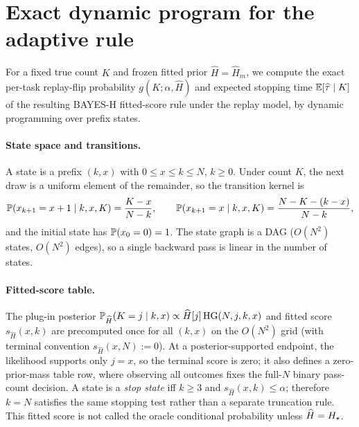 \section{Exact dynamic program for the adaptive rule}
\label{app:dp}

For a fixed true count $K$ and frozen fitted prior
$\widehat H=\widehat H_m$, we compute the exact per-task replay-flip
probability $g(K;\alpha,\widehat H)$ and expected stopping time
$\E[\widehat\tau\mid K]$ of the resulting BAYES-H fitted-score rule under the
replay model, by dynamic programming over prefix states.

\paragraph{State space and transitions.}
A state is a prefix $(k,x)$ with $0\le x\le k\le N$, $k\ge 0$. Under
count $K$, the next draw is a uniform element of the remainder, so the
transition kernel is
\[
\P(x_{k+1}=x+1\mid k,x,K)=\frac{K-x}{N-k},
\qquad
\P(x_{k+1}=x\mid k,x,K)=\frac{N-K-(k-x)}{N-k},
\]
and the initial state has $\P(x_0=0)=1$. The state graph is a DAG
($O(N^2)$ states, $O(N^2)$ edges), so a single backward pass is linear
in the number of states.

\paragraph{Fitted-score table.}
The plug-in posterior $\P_{\widehat H}(K=j\mid k,x)\propto
\widehat H[j]\,\HG(N,j,k,x)$ and fitted score $s_{\widehat H}(x,k)$ are
precomputed once for all $(k,x)$ on the $O(N^2)$ grid (with terminal convention
$s_{\widehat H}(x,N):=0$). At a posterior-supported endpoint, the likelihood
supports only $j=x$, so the terminal score is zero; it also defines a
zero-prior-mass table row, where observing all outcomes fixes the full-$N$
binary pass-count decision. A state is a \emph{stop state} iff $k\ge3$ and
$s_{\widehat H}(x,k)\le\alpha$; therefore $k=N$ satisfies the same stopping
test rather than a separate truncation rule. This fitted score is not called
the oracle conditional probability unless $\widehat H=\trueH$.

